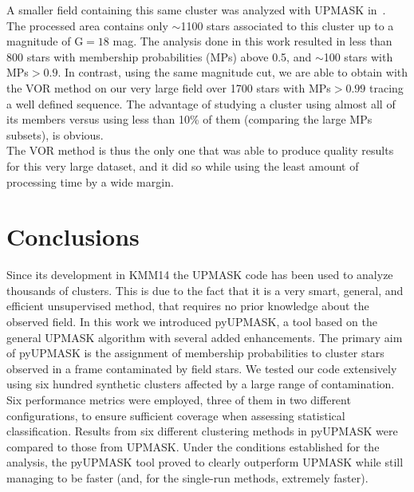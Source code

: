 \documentclass{aa}
\begin{document}
 A smaller field containing this same cluster was analyzed with UPMASK
 in~\cite{Cantat_2018}. The processed area contains only
 $\sim$1100 stars associated to this cluster up to a magnitude of G${=}18$ mag.
 The analysis done in this work resulted in less than 800 stars
 with membership probabilities (MPs) above 0.5, and $\sim$100 stars with
 MPs$>0.9$. In contrast, using the same magnitude cut, we are able to obtain
 with the VOR method on our very large field over 1700 stars with MPs$>0.99$
 tracing a well defined sequence. The advantage of studying a cluster
 using almost all of its members versus using less than 10\% of them 
 (comparing the large MPs subsets), is obvious.\\

 The VOR method is thus the only one that was able to produce quality results
 for this very large dataset, and it did so while using the least amount of
 processing time by a wide margin.








\section{Conclusions}
 \label{sec:conclusions}

 Since its development in KMM14 the UPMASK code has been used to analyze
 thousands of clusters. This is due to the fact that it is a very
 smart, general, and efficient unsupervised method, that requires no prior
 knowledge about the observed field.
 In this work we introduced pyUPMASK, a tool based on the general UPMASK
 algorithm with several added enhancements. The primary aim of pyUPMASK is the
 assignment of membership probabilities to cluster stars observed in a frame
 contaminated by field stars.
 We tested our code extensively using six hundred synthetic clusters affected
 by a large range of contamination. Six performance metrics were employed,
 three of them in two different configurations, to ensure sufficient coverage
 when assessing statistical classification.
 Results from six different clustering methods in pyUPMASK were compared to
 those from UPMASK.
 Under the conditions established for the analysis, the pyUPMASK tool proved to
 clearly outperform UPMASK 
 while still managing to be faster (and, for the single-run methods, extremely
 faster).
\end{document}
